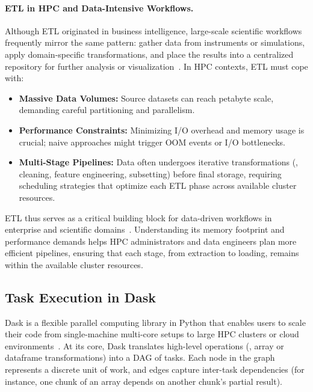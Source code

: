 \paragraph{\ac{ETL} in \ac{HPC} and Data-Intensive Workflows.}
Although \ac{ETL} originated in business intelligence, large-scale scientific workflows frequently mirror the same pattern: gather data from instruments or simulations, apply domain-specific transformations, and place the results into a centralized repository for further analysis or visualization~\cite{Vassiliadis2009ETL}.
In \ac{HPC} contexts, \ac{ETL} must cope with:
\begin{itemize}
    \item \textbf{Massive Data Volumes:} Source datasets can reach petabyte scale, demanding careful partitioning and parallelism.
    \item \textbf{Performance Constraints:} Minimizing \ac{I/O} overhead and memory usage is crucial; naive approaches might trigger \ac{OOM} events or \ac{I/O} bottlenecks.
    \item \textbf{Multi-Stage Pipelines:} Data often undergoes iterative transformations (\eg{}, cleaning, feature engineering, subsetting) before final storage, requiring scheduling strategies that optimize each \ac{ETL} phase across available cluster resources.
\end{itemize}

\ac{ETL} thus serves as a critical building block for data-driven workflows in enterprise and scientific domains~\cite{Vassiliadis2009ETL}.
Understanding its memory footprint and performance demands helps \ac{HPC} administrators and data engineers plan more efficient pipelines, ensuring that each stage, from extraction to loading, remains within the available cluster resources.

\subsection{Task Execution in Dask}
\label{subsec:fundamentals-dask-execution}

Dask is a flexible parallel computing library in Python that enables users to scale their code from single-machine multi-core setups to large \ac{HPC} clusters or cloud environments~\cite{rocklin2015dask}.
At its core, Dask translates high-level operations (\eg, array or dataframe transformations) into a \ac{DAG} of tasks.
Each node in the graph represents a discrete unit of work, and edges capture inter-task dependencies (for instance, one chunk of an array depends on another chunk's partial result).

